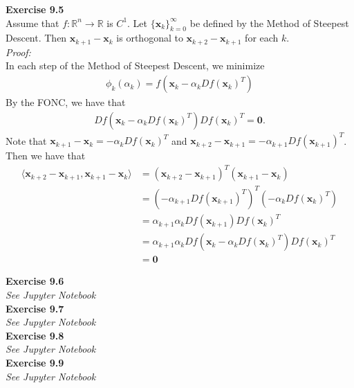 \documentclass[letterpaper,12pt]{article}
\let\vec\mathbf
\theoremstyle{definition}
\begin{document}
\textbf{Exercise 9.5} \\
Assume that $f: \mathbb{R}^n \rightarrow \mathbb{R}$ is $C^1$. Let $\{\vec{x}_k\}_{k=0}^\infty$ be defined by the Method of Steepest Descent. Then $\vec{x}_{k+1} - \vec{x}_k$ is orthogonal to $\vec{x}_{k+2} - \vec{x}_{k+1}$ for each $k$. \\
\textit{Proof:} \\
In each step of the Method of Steepest Descent, we minimize
\begin{align*}
  \phi_k(\alpha_k) = f(\vec{x}_k - \alpha_k Df(\vec{x}_k)^T)
\end{align*}
By the FONC, we have that
\begin{align*}
  Df(\vec{x}_k - \alpha_k Df(\vec{x}_k)^T)Df(\vec{x}_k)^T = \vec{0}.
\end{align*}
Note that $\vec{x}_{k+1} - \vec{x}_k = -\alpha_k Df(\vec{x}_k)^T$ and $\vec{x}_{k+2} - \vec{x}_{k+1} = -\alpha_{k+1} Df(\vec{x}_{k+1})^T$. Then we have that
\begin{align*}
  \langle \vec{x}_{k+2} - \vec{x}_{k+1}, \vec{x}_{k+1} - \vec{x}_k \rangle
  &=
  (\vec{x}_{k+2} - \vec{x}_{k+1})^T (\vec{x}_{k+1} - \vec{x}_k) \\
  &=
  (-\alpha_{k+1} Df(\vec{x}_{k+1})^T)^T (-\alpha_k Df(\vec{x}_k)^T) \\
  &=
  \alpha_{k+1}\alpha_k Df(\vec{x}_{k+1})  Df(\vec{x}_k)^T \\
  &=
  \alpha_{k+1}\alpha_k Df(\vec{x}_k - \alpha_k Df(\vec{x}_k)^T) Df(\vec{x}_k)^T \\
  &= \vec{0}
\end{align*}

\textbf{Exercise 9.6} \\
\textit{See Jupyter Notebook} \\

\textbf{Exercise 9.7} \\
\textit{See Jupyter Notebook} \\

\textbf{Exercise 9.8} \\
\textit{See Jupyter Notebook} \\

\textbf{Exercise 9.9} \\
\textit{See Jupyter Notebook} \\
\end{document}
